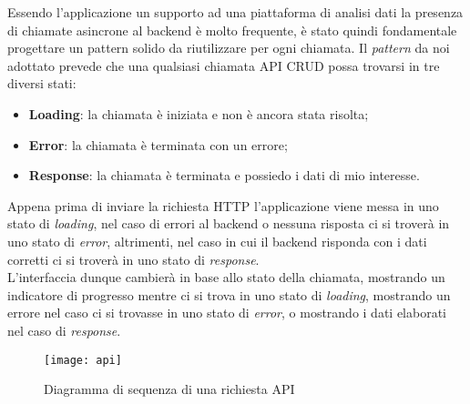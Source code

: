 Essendo l'applicazione un supporto ad una piattaforma di analisi dati la presenza di chiamate asincrone al backend è molto frequente, è stato quindi fondamentale progettare un pattern solido da riutilizzare per ogni chiamata.
Il \textit{pattern} da noi adottato prevede che una qualsiasi chiamata API CRUD possa trovarsi in tre diversi stati:
\begin{itemize}
    \item \textbf{Loading}: la chiamata è iniziata e non è ancora stata risolta;
    \item \textbf{Error}: la chiamata è terminata con un errore;
    \item \textbf{Response}: la chiamata è terminata e possiedo i dati di mio interesse.
\end{itemize}
Appena prima di inviare la richiesta HTTP l'applicazione viene messa in uno stato di \textit{loading}, nel caso di errori al backend o nessuna risposta ci si troverà in uno stato di \textit{error}, altrimenti, nel caso in cui il backend risponda con i dati corretti ci si troverà in uno stato di \textit{response}.\\
L'interfaccia dunque cambierà in base allo stato della chiamata, mostrando un indicatore di progresso mentre ci si trova in uno stato di \textit{loading}, mostrando un errore nel caso ci si trovasse in uno stato di \textit{error}, o mostrando i dati elaborati nel caso di \textit{response}.
\begin{figure}[h!]
    \centering
    \texttt{[image: api]}
    \caption{Diagramma di sequenza di una richiesta API}
\end{figure}
